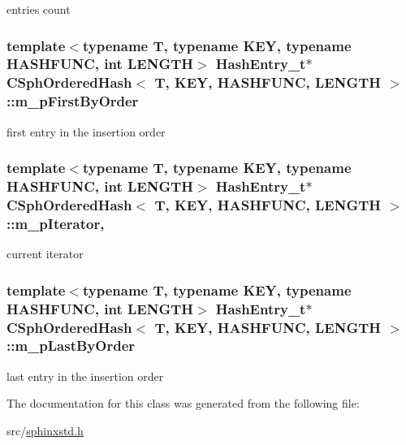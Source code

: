 entries count 

\hypertarget{classCSphOrderedHash_a5c5de4c3874059e02c6a3754881dd181}{
\subsubsection[{m\-\_\-p\-First\-By\-Order}]{\setlength{\rightskip}{0pt plus 5cm}template$<$typename T, typename K\-E\-Y, typename H\-A\-S\-H\-F\-U\-N\-C, int L\-E\-N\-G\-T\-H$>$ {\bf Hash\-Entry\-\_\-t}$\ast$ {\bf C\-Sph\-Ordered\-Hash}$<$ T, K\-E\-Y, H\-A\-S\-H\-F\-U\-N\-C, L\-E\-N\-G\-T\-H $>$\-::m\-\_\-p\-First\-By\-Order\hspace{0.3cm}{\ttfamily [protected]}}}\label{classCSphOrderedHash_a5c5de4c3874059e02c6a3754881dd181}


first entry in the insertion order 

\hypertarget{classCSphOrderedHash_ad2e7790bd07bbd2d2f0b398fe88a9772}{
\subsubsection[{m\-\_\-p\-Iterator}]{\setlength{\rightskip}{0pt plus 5cm}template$<$typename T, typename K\-E\-Y, typename H\-A\-S\-H\-F\-U\-N\-C, int L\-E\-N\-G\-T\-H$>$ {\bf Hash\-Entry\-\_\-t}$\ast$ {\bf C\-Sph\-Ordered\-Hash}$<$ T, K\-E\-Y, H\-A\-S\-H\-F\-U\-N\-C, L\-E\-N\-G\-T\-H $>$\-::m\-\_\-p\-Iterator\hspace{0.3cm}{\ttfamily [mutable]}, {\ttfamily [private]}}}\label{classCSphOrderedHash_ad2e7790bd07bbd2d2f0b398fe88a9772}


current iterator 

\hypertarget{classCSphOrderedHash_abd1445b98881815257ff731a0b409886}{
\subsubsection[{m\-\_\-p\-Last\-By\-Order}]{\setlength{\rightskip}{0pt plus 5cm}template$<$typename T, typename K\-E\-Y, typename H\-A\-S\-H\-F\-U\-N\-C, int L\-E\-N\-G\-T\-H$>$ {\bf Hash\-Entry\-\_\-t}$\ast$ {\bf C\-Sph\-Ordered\-Hash}$<$ T, K\-E\-Y, H\-A\-S\-H\-F\-U\-N\-C, L\-E\-N\-G\-T\-H $>$\-::m\-\_\-p\-Last\-By\-Order\hspace{0.3cm}{\ttfamily [protected]}}}\label{classCSphOrderedHash_abd1445b98881815257ff731a0b409886}


last entry in the insertion order 



The documentation for this class was generated from the following file\-:\begin{DoxyCompactItemize}
\item 
src/\hyperlink{sphinxstd_8h}{sphinxstd.\-h}\end{DoxyCompactItemize}
